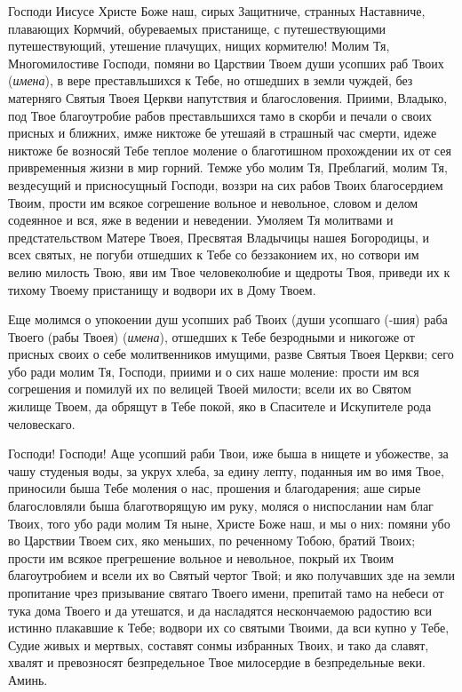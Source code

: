 \mychapterending


\begin{mymulticols}
 


Господи Иисусе Христе Боже наш, сирых Защитниче, странных Наставниче, плавающих Кормчий, обуреваемых пристанище, с путешествующими путешествующий, утешение плачущих, нищих кормителю! Молим Тя, Многомилостиве Господи, помяни во Царствии Твоем души усопших раб Твоих ({\itshape имена}), в вере преставльшихся к Тебе, но отшедших в земли чуждей, без матерняго Святыя Твоея Церкви напутствия и благословения. Приими, Владыко, под Твое благоутробие рабов преставльшихся тамо в скорби и печали о своих присных и ближних, имже никтоже бе утешаяй в страшный час смерти, идеже никтоже бе возносяй Тебе теплое моление о благотишном прохождении их от сея привременныя жизни в мир горний. Темже убо молим Тя, Преблагий, молим Тя, вездесущий и присносущный Господи, воззри на сих рабов Твоих благосердием Твоим, прости им всякое согрешение вольное и невольное, словом и делом содеянное и вся, яже в ведении и неведении. Умоляем Тя молитвами и предстательством Матере Твоея, Пресвятая Владычицы нашея Богородицы, и всех святых, не погуби отшедших к Тебе со беззаконием их, но сотвори им велию милость Твою, яви им Твое человеколюбие и щедроты Твоя, приведи их к тихому Твоему пристанищу и водвори их в Дому Твоем. 

Еще молимся о упокоении душ усопших раб Твоих (души усопшаго (-шия) раба Твоего (рабы Твоея) ({\itshape имена}), отшедших к Тебе безродными и никогоже от присных своих о себе молитвенников имущими, разве Святыя Твоея Церкви; сего убо ради молим Тя, Господи, приими и о сих наше моление: прости им вся согрешения и помилуй их по велицей Твоей милости; всели их во Святом жилище Твоем, да обрящут в Тебе покой, яко в Спасителе и Искупителе рода человескаго. 

Господи! Господи! Аще усопший раби Твои, иже быша в нищете и убожестве, за чашу студеныя воды, за укрух хлеба, за едину лепту, поданныя им во имя Твое, приносили быша Тебе моления о нас, прошения и благодарения; аше сирые благословляли быша благотворящую им руку, моляся о ниспослании нам благ Твоих, того убо ради молим Тя ныне, Христе Боже наш, и мы о них: помяни убо во Царствии Твоем сих, яко меньших, по реченному Тобою, братий Твоих; прости им всякое прегрешение вольное и невольное, покрый их Твоим благоутробием и всели их во Святый чертог Твой; и яко получавших зде на земли пропитание чрез призывание святаго Твоего имени, препитай тамо на небеси от тука дома Твоего и да утешатся, и да насладятся нескончаемою радостию вси истинно плакавшие к Тебе; водвори их со святыми Твоими, да вси купно у Тебе, Судие живых и мертвых, составят сонмы избранных Твоих, и тако да славят, хвалят и превозносят безпредельное Твое милосердие в безпредельные веки. Аминь. 

\end{mymulticols}

